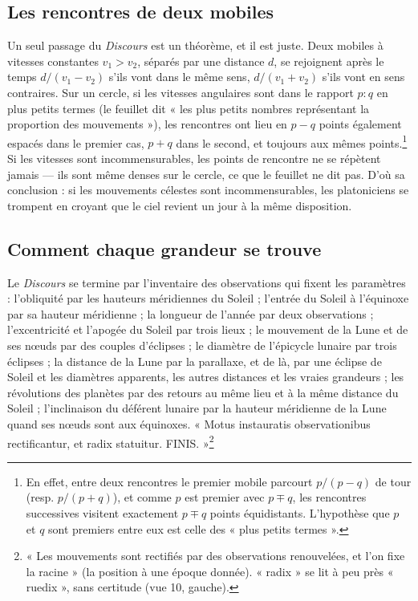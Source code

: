 \documentclass[11pt,a4paper]{article}
\begin{document}
\subsection*{Les rencontres de deux mobiles}

Un seul passage du \emph{Discours} est un théorème, et il est juste. Deux mobiles
à vitesses constantes $v_1 > v_2$, séparés par une distance $d$, se rejoignent
après le temps $d/(v_1-v_2)$ s'ils vont dans le même sens, $d/(v_1+v_2)$ s'ils vont
en sens contraires. Sur un cercle, si les vitesses angulaires sont dans le
rapport $p:q$ en plus petits termes (le feuillet dit « les plus petits nombres
représentant la proportion des mouvements »), les rencontres ont lieu en
$p-q$ points également espacés dans le premier cas, $p+q$ dans le second, et
toujours aux mêmes points.\footnote{En effet, entre deux rencontres le premier
mobile parcourt $p/(p-q)$ de tour (resp. $p/(p+q)$), et comme $p$ est premier
avec $p\mp q$, les rencontres successives visitent exactement $p\mp q$ points
équidistants. L'hypothèse que $p$ et $q$ sont premiers entre eux est celle des
« plus petits termes ».} Si les vitesses sont incommensurables, les points de
rencontre ne se répètent jamais — ils sont même denses sur le cercle, ce que le
feuillet ne dit pas. D'où sa conclusion : si les mouvements célestes sont
incommensurables, les platoniciens se trompent en croyant que le ciel revient
un jour à la même disposition.

\subsection*{Comment chaque grandeur se trouve}

Le \emph{Discours} se termine par l'inventaire des observations qui fixent les
paramètres : l'obliquité par les hauteurs méridiennes du Soleil ; l'entrée du
Soleil à l'équinoxe par sa hauteur méridienne ; la longueur de l'année par deux
observations ; l'excentricité et l'apogée du Soleil par trois lieux ; le
mouvement de la Lune et de ses nœuds par des couples d'éclipses ; le diamètre de
l'épicycle lunaire par trois éclipses ; la distance de la Lune par la
parallaxe, et de là, par une éclipse de Soleil et les diamètres apparents, les
autres distances et les vraies grandeurs ; les révolutions des planètes par des
retours au même lieu et à la même distance du Soleil ; l'inclinaison du
déférent lunaire par la hauteur méridienne de la Lune quand ses nœuds sont aux
équinoxes. « Motus instauratis observationibus rectificantur, et radix
statuitur. FINIS. »\footnote{« Les mouvements sont rectifiés par des observations
renouvelées, et l'on fixe la racine » (la position à une époque donnée).
« radix » se lit à peu près « ruedix », sans certitude (vue 10, gauche).}
\end{document}
